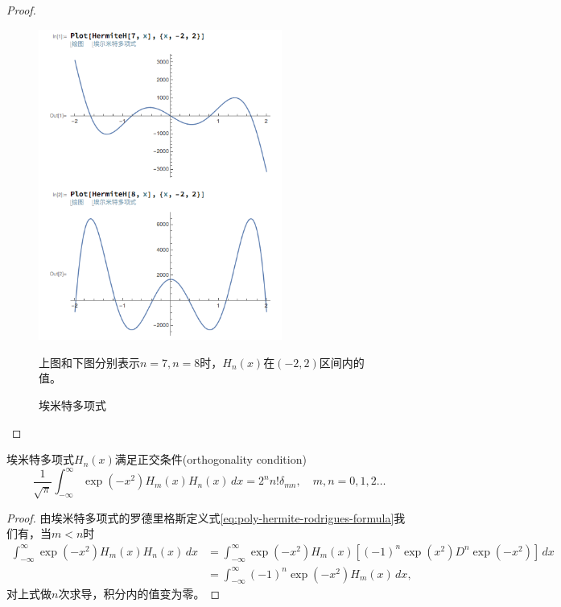 \begin{subappendices}
\begin{proof}
\begin{figure}[htbp]
   \caption{埃米特多项式}
  \centering
  \includegraphics[width=8cm]{./Figures/20170905-hermite-examples-7-8}
  \label{fig:poly-hermite-examples-7-8}
%

\small{上图和下图分别表示$n=7,n=8$时，$H_n(x)$在$(-2,2)$区间内的值。}
\end{figure}
\end{proof}

\begin{theorem}[埃米特多项式的正交条件]
  埃米特多项式$H_n(x)$满足正交条件(orthogonality condition)
  \begin{equation}
    \label{eq:poly-hermite-orthogonality-condition}
    \frac{1}{\sqrt{\pi}} \int_{-\infty}^{\infty} \exp(-x^2) H_m(x) H_n(x) \, dx = 2^n n! \delta_{mn}, \quad m,n = 0,1,2\ldots
  \end{equation}
\end{theorem}

\begin{proof}
由埃米特多项式的罗德里格斯定义式\eqref{eq:poly-hermite-rodrigues-formula}我们有，当$m<n$时
\begin{equation*}
  \begin{split}
    \int_{-\infty}^{\infty} \exp(-x^2) H_m(x) H_n(x) \, dx &= \int_{-\infty}^{\infty} \exp(-x^2) H_m(x) \left[ (-1)^n \exp(x^2) D^n \exp(-x^2) \right] \, dx \\
    &= \int_{-\infty}^{\infty} (-1)^n \exp(-x^2) H_m(x) \, dx,  \end{split}
\end{equation*}
对上式做$n$次求导，积分内的值变为零。


\end{proof}
\end{subappendices}
